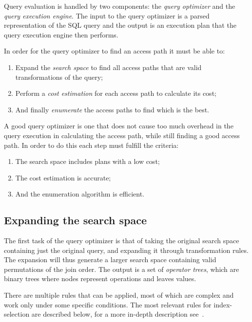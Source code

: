 Query evaluation is handled by two components: the \textit{query optimizer} and
the \textit{query execution engine}. The input to the query optimizer is a
parsed representation of the SQL query and the output is an execution plan that
the query execution engine then performs.

In order for the query optimizer to find an access path it must be able to:
\begin{enumerate}
\item Expand the \textit{search space} to find all access paths that are valid
  transformations of the query;
\item Perform a \textit{cost estimation} for each access path to calculate its
  cost;
\item And finally \textit{enumerate} the access paths to find which is the best.
\end{enumerate}

A good query optimizer is one that does not cause too much overhead in the query
execution in calculating the access path, while still finding a good access
path. In order to do this each step must fulfill the criteria:
\begin{enumerate}
\item The search space includes plans with a low cost;
\item The cost estimation is accurate;
\item And the enumeration algorithm is efficient.
\end{enumerate}

\subsection{Expanding the search space}
The first task of the query optimizer is that of taking the original search
space containing just the original query, and expanding it through
transformation rules. The expansion will thus generate a larger search space
containing valid permutations of the join order. The output is a set of
\textit{operator trees}, which are binary trees where nodes represent operations
and leaves values.

There are multiple rules that can be applied, most of which are complex and work
only under some specific conditions. The most relevant rules for index-selection
are described below, for a more in-depth description
see~\cite{chaudhuri_1998_overview_aooqoirs}.

